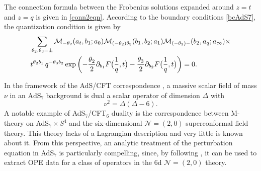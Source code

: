 \documentclass[11pt]{article}
\numberwithin{equation}{section}
\newcommand{\be}{\begin{equation}}
\newcommand{\ee}{\end{equation}}
\begin{document}
The connection formula between the Frobenius solutions expanded around $z=t$ and $z=q$ is given in \eqref{conn2eqn}. 
According to the boundary conditions \eqref{bcAdS7}, the quantization condition is given by
\begin{equation}\label{eq:qcads7full}
\begin{aligned}
&\sum_{\theta_2,\theta_3=\pm}\mathcal{M}_{-\theta_2}(a_t,b_1;a_0)\mathcal{M}_{(-\theta_2)\theta_3}(b_1,b_2;a_1)\mathcal{M}_{(-\theta_3)-}(b_2,a_{q};a_{\infty})\times\\
&t^{\theta_2b_1}\,q^{-\theta_3b_2}\exp\left(-\frac{\theta_2}{2}\partial_{b_1}F\big({1\over q},t\big)-\frac{\theta_3}{2}\partial_{b_2}F\big({1\over q},t\big)\right)=0.
%
\end{aligned}
\end{equation}

In the framework of the AdS/CFT correspondence \cite{adscft,Witten:1998qj,Gubser:1998bc},
%
 a massive scalar field of mass $\nu$ in an $\mathrm{AdS}_7$ background is dual  a  scalar operator of dimension $\Delta$ with
\be
\nu^2 = \Delta(\Delta - 6).
\ee
A notable example of AdS$_7$/CFT$_6$ duality is the correspondence between M-theory on AdS$_7 \times S^4$ and the six-dimensional $\mathcal{N}=(2,0)$ superconformal field theory. This theory lacks of a Lagrangian description and very little is known about it. From this perspective, an analytic treatment of the perturbation equation in AdS$_7$ is particularly compelling, since, by following \cite{Dodelson:2022yvn}, it can be used to extract  OPE data for a class of operators in the 6d $\mathcal{N} = (2,0)$ theory. 
\end{document}
